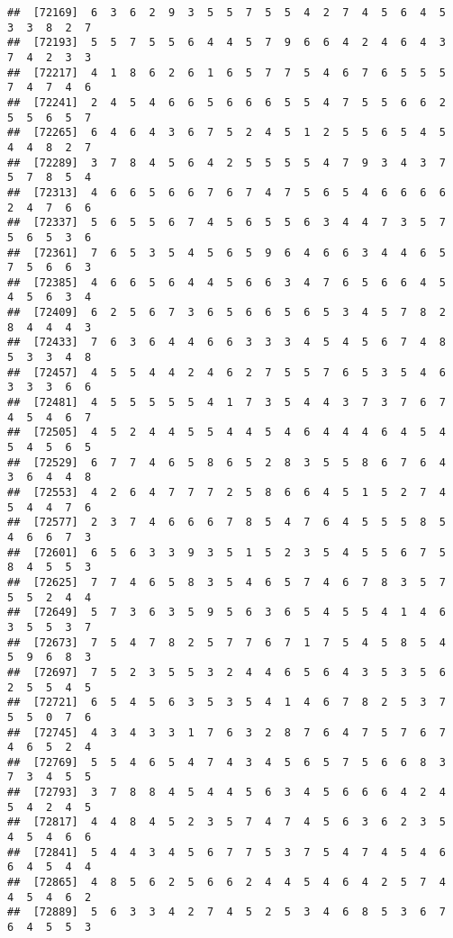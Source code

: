 \documentclass[
]{book}
\begin{document}
\begin{verbatim}
##  [72169]  6  3  6  2  9  3  5  5  7  5  5  4  2  7  4  5  6  4  5  3  3  8  2  7
##  [72193]  5  5  7  5  5  6  4  4  5  7  9  6  6  4  2  4  6  4  3  7  4  2  3  3
##  [72217]  4  1  8  6  2  6  1  6  5  7  7  5  4  6  7  6  5  5  5  7  4  7  4  6
##  [72241]  2  4  5  4  6  6  5  6  6  6  5  5  4  7  5  5  6  6  2  5  5  6  5  7
##  [72265]  6  4  6  4  3  6  7  5  2  4  5  1  2  5  5  6  5  4  5  4  4  8  2  7
##  [72289]  3  7  8  4  5  6  4  2  5  5  5  5  4  7  9  3  4  3  7  5  7  8  5  4
##  [72313]  4  6  6  5  6  6  7  6  7  4  7  5  6  5  4  6  6  6  6  2  4  7  6  6
##  [72337]  5  6  5  5  6  7  4  5  6  5  5  6  3  4  4  7  3  5  7  5  6  5  3  6
##  [72361]  7  6  5  3  5  4  5  6  5  9  6  4  6  6  3  4  4  6  5  7  5  6  6  3
##  [72385]  4  6  6  5  6  4  4  5  6  6  3  4  7  6  5  6  6  4  5  4  5  6  3  4
##  [72409]  6  2  5  6  7  3  6  5  6  6  5  6  5  3  4  5  7  8  2  8  4  4  4  3
##  [72433]  7  6  3  6  4  4  6  6  3  3  3  4  5  4  5  6  7  4  8  5  3  3  4  8
##  [72457]  4  5  5  4  4  2  4  6  2  7  5  5  7  6  5  3  5  4  6  3  3  3  6  6
##  [72481]  4  5  5  5  5  5  4  1  7  3  5  4  4  3  7  3  7  6  7  4  5  4  6  7
##  [72505]  4  5  2  4  4  5  5  4  4  5  4  6  4  4  4  6  4  5  4  5  4  5  6  5
##  [72529]  6  7  7  4  6  5  8  6  5  2  8  3  5  5  8  6  7  6  4  3  6  4  4  8
##  [72553]  4  2  6  4  7  7  7  2  5  8  6  6  4  5  1  5  2  7  4  5  4  4  7  6
##  [72577]  2  3  7  4  6  6  6  7  8  5  4  7  6  4  5  5  5  8  5  4  6  6  7  3
##  [72601]  6  5  6  3  3  9  3  5  1  5  2  3  5  4  5  5  6  7  5  8  4  5  5  3
##  [72625]  7  7  4  6  5  8  3  5  4  6  5  7  4  6  7  8  3  5  7  5  5  2  4  4
##  [72649]  5  7  3  6  3  5  9  5  6  3  6  5  4  5  5  4  1  4  6  3  5  5  3  7
##  [72673]  7  5  4  7  8  2  5  7  7  6  7  1  7  5  4  5  8  5  4  5  9  6  8  3
##  [72697]  7  5  2  3  5  5  3  2  4  4  6  5  6  4  3  5  3  5  6  2  5  5  4  5
##  [72721]  6  5  4  5  6  3  5  3  5  4  1  4  6  7  8  2  5  3  7  5  5  0  7  6
##  [72745]  4  3  4  3  3  1  7  6  3  2  8  7  6  4  7  5  7  6  7  4  6  5  2  4
##  [72769]  5  5  4  6  5  4  7  4  3  4  5  6  5  7  5  6  6  8  3  7  3  4  5  5
##  [72793]  3  7  8  8  4  5  4  4  5  6  3  4  5  6  6  6  4  2  4  5  4  2  4  5
##  [72817]  4  4  8  4  5  2  3  5  7  4  7  4  5  6  3  6  2  3  5  4  5  4  6  6
##  [72841]  5  4  4  3  4  5  6  7  7  5  3  7  5  4  7  4  5  4  6  6  4  5  4  4
##  [72865]  4  8  5  6  2  5  6  6  2  4  4  5  4  6  4  2  5  7  4  4  5  4  6  2
##  [72889]  5  6  3  3  4  2  7  4  5  2  5  3  4  6  8  5  3  6  7  6  4  5  5  3

\end{verbatim}
\end{document}
